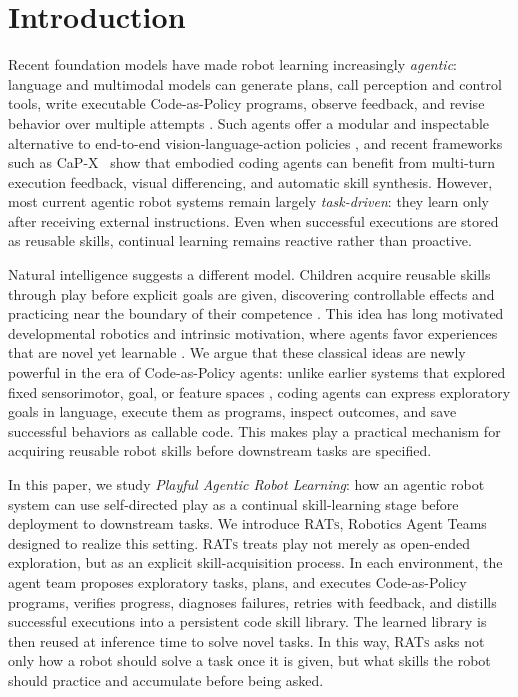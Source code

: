 \documentclass{llmxive}
\begin{document}
\section{Introduction}
\label{sec:introduction}

Recent foundation models have made robot learning increasingly \emph{agentic}: language and multimodal models can generate plans, call perception and control tools, write executable Code-as-Policy programs, observe feedback, and revise behavior over multiple attempts \citep{liang2023code, singh2023progprompt, vemprala2024chatgpt}. Such agents offer a modular and inspectable alternative to end-to-end vision-language-action policies \citep{zitkovich2023rt2, black2025pi0, physicalintelligence2025pi05}, and recent frameworks such as CaP-X~\citep{fu2026capx} show that embodied coding agents can benefit from multi-turn execution feedback, visual differencing, and automatic skill synthesis. 
However, most current agentic robot systems remain largely \emph{task-driven}: they learn only after receiving external instructions. Even when successful executions are stored as reusable skills, continual learning remains reactive rather than proactive.

Natural intelligence suggests a different model. Children acquire reusable skills through play before explicit goals are given, discovering controllable effects and practicing near the boundary of their competence \citep{piaget1952origins, gopnik2020childhood, smith2005developmental}. This idea has long motivated developmental robotics and intrinsic motivation, where agents favor experiences that are novel yet learnable \citep{schmidhuber1991curious, oudeyer2007intrinsic, baranes2013active, forestier2016modular}. We argue that these classical ideas are newly powerful in the era of Code-as-Policy agents: unlike earlier systems that explored fixed sensorimotor, goal, or feature spaces \citep{oudeyer2007intrinsic, baranes2013active, pathak2017curiosity, houthooft2016vime}, coding agents can express exploratory goals in language, execute them as programs, inspect outcomes, and save successful behaviors as callable code. This makes play a practical mechanism for acquiring reusable robot skills before downstream tasks are specified.

In this paper, we study \emph{Playful Agentic Robot Learning}: how an agentic robot system can use self-directed play as a continual skill-learning stage before deployment to downstream tasks. 
We introduce \textsc{RATs}, Robotics Agent Teams designed to realize this setting. \textsc{RATs} treats play not merely as open-ended exploration, but as an explicit skill-acquisition process. 
In each environment, the agent team proposes exploratory tasks, plans, and executes Code-as-Policy programs, verifies progress, diagnoses failures, retries with feedback, and distills successful executions into a persistent code skill library. 
The learned library is then reused at inference time to solve novel tasks. In this way, \textsc{RATs} asks not only how a robot should solve a task once it is given, but what skills the robot should practice and accumulate before being asked.
\end{document}
